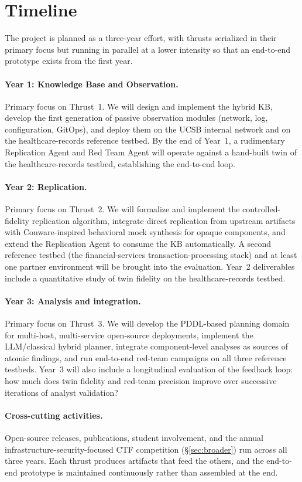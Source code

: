 \section{Timeline}
\label{sec:timeline}

The project is planned as a three-year effort, with thrusts serialized
in their primary focus but running in parallel at a lower intensity so
that an end-to-end prototype exists from the first year.

\paragraph{Year 1: Knowledge Base and Observation.}
Primary focus on Thrust~1. We will design and implement the hybrid
KB, develop the first generation of passive observation modules
(network, log, configuration, GitOps), and deploy them on the UCSB
internal network and on the healthcare-records reference testbed. By
the end of Year~1, a rudimentary Replication Agent and Red Team Agent
will operate against a hand-built twin of the healthcare-records
testbed, establishing the end-to-end loop.

\paragraph{Year 2: Replication.}
Primary focus on Thrust~2. We will formalize and implement the
controlled-fidelity replication algorithm, integrate direct
replication from upstream artifacts with Conware-inspired behavioral
mock synthesis for opaque components, and extend the Replication
Agent to consume the KB automatically. A second reference testbed
(the financial-services transaction-processing stack) and at least
one partner environment will be brought into the evaluation.
Year~2 deliverables include a quantitative study of twin fidelity on
the healthcare-records testbed.

\paragraph{Year 3: Analysis and integration.}
Primary focus on Thrust~3. We will develop the PDDL-based planning
domain for multi-host, multi-service open-source deployments,
implement the LLM/classical hybrid planner, integrate component-level
analyses as sources of atomic findings, and run end-to-end red-team
campaigns on all three reference testbeds. Year~3 will also include a
longitudinal evaluation of the feedback loop: how much does twin
fidelity and red-team precision improve over successive iterations of
analyst validation?

\paragraph{Cross-cutting activities.}
Open-source releases, publications, student involvement, and the
annual infrastructure-security-focused CTF competition
(\S\ref{sec:broader}) run across all three years. Each thrust
produces artifacts that feed the others, and the end-to-end prototype
is maintained continuously rather than assembled at the end.
